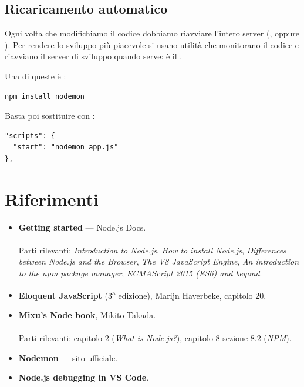 
\subsection{Ricaricamento automatico}

Ogni volta che modifichiamo il codice dobbiamo riavviare l'intero server
(, oppure ). Per rendere lo sviluppo più
piacevole si usano utilità che monitorano il codice e riavviano il server di
sviluppo quando serve: è il .

Una di queste è :

\begin{lstlisting}[style=shell]
npm install nodemon
\end{lstlisting}

Basta poi sostituire  con :

\begin{lstlisting}[style=json, name=package.json]
"scripts": {
  "start": "nodemon app.js"
},
\end{lstlisting}

\section{Riferimenti}

\begin{itemize}
  \item \textbf{Getting started} --- Node.js Docs. \\
         \\
        Parti rilevanti: \textit{Introduction to Node.js}, \textit{How to
        install Node.js}, \textit{Differences between Node.js and the Browser},
        \textit{The V8 JavaScript Engine}, \textit{An introduction to the npm
        package manager}, \textit{ECMAScript 2015 (ES6) and beyond}.
  \item \textbf{Eloquent JavaScript} (3\textsuperscript{a} edizione), Marijn
        Haverbeke, capitolo 20. \\
  \item \textbf{Mixu's Node book}, Mikito Takada. \\
         \\
        Parti rilevanti: capitolo 2 (\textit{What is Node.js?}), capitolo 8
        sezione 8.2 (\textit{NPM}).
  \item \textbf{Nodemon} --- sito ufficiale. \\
  \item \textbf{Node.js debugging in VS Code}. \\
\end{itemize}
